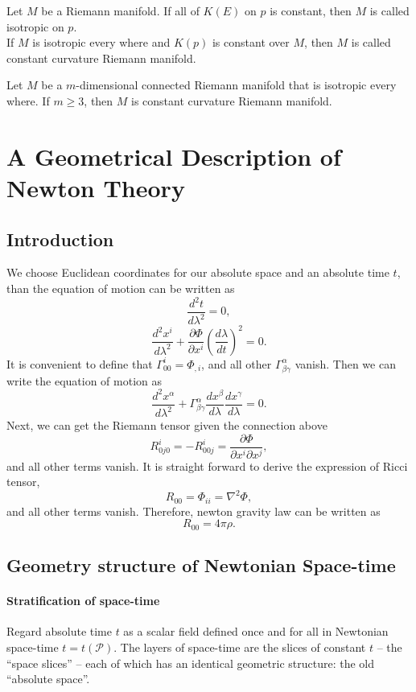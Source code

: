 \begin{newdef}
Let $M$ be a Riemann manifold. If all of $K(E)$ on $p$ is constant, then $M$ is called isotropic on $p$. \\
If $M$ is isotropic every where and $K(p)$ is constant over $M$, then $M$ is called constant curvature Riemann manifold.
\end{newdef}

\begin{newthem} 
Let $M$ be a $m$-dimensional connected Riemann manifold that is isotropic every where. If $m \geq 3$, then $M$ is constant curvature Riemann manifold.
\end{newthem}

\chapter{A Geometrical Description of Newton Theory}
\section{Introduction}
\noindent
We choose Euclidean coordinates for our absolute space and an absolute time $t$, than the equation of motion can be written as
\[\frac{d^2 t}{d\lambda^2} = 0,\]
\[\frac{d^2 x^i}{d\lambda^2} + \frac{\partial \Phi}{\partial x^i} (\frac{d\lambda}{dt})^2=0.\]
It is convenient to define that $\Gamma^i_{00} = \Phi_{,i}$, and all other $\Gamma^{\alpha}_{\beta \gamma}$ vanish. Then we can write the equation of motion as
\[\frac{d^2 x^{\alpha}}{d\lambda^2} + \Gamma^{\alpha}_{\beta \gamma} \frac{dx^{\beta}}{d \lambda} \frac{dx^{\gamma}}{d \lambda}=0.\]
Next, we can get the Riemann tensor given the connection above\[
R^i_{0j0} = -R^i_{00j} = \frac{\partial \Phi}{\partial x^i \partial x^j}, \]
and all other terms vanish. 
It is straight forward to derive the expression of Ricci tensor,
\[R_{00} = \Phi_{ii} = \nabla^2\Phi,\]
and all other terms vanish.
Therefore, newton gravity law can be written as
\[R_{00} = 4\pi\rho.\]

\section{Geometry structure of Newtonian Space-time}
\subsubsection{Stratification of space-time}
Regard absolute time $t$ as a scalar field defined once and for all in Newtonian space-time $t=t(\mathcal{P})$. The layers of space-time are the slices of constant $t$ -- the ``space slices'' -- each of which has an identical geometric structure: the old ``absolute space''.


